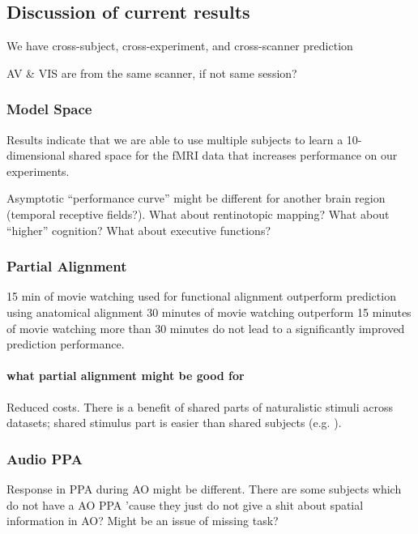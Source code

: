 \subsection{Discussion of current results}


We have cross-subject, cross-experiment, and cross-scanner prediction


AV \& VIS are from the same scanner, if not same session?

\subsubsection{Model Space}
%
Results indicate that we are able to use multiple subjects to learn a
10-dimensional shared space for the fMRI data that increases performance on our
experiments.

%
Asymptotic ``performance curve'' might be different for another brain region
(temporal receptive fields?).
%
What about rentinotopic mapping?
%
What about ``higher'' cognition?
%
What about executive functions?


\subsubsection{Partial Alignment}
%
15 min of movie watching used for functional alignment outperform prediction
using anatomical alignment
%
30 minutes of movie watching outperform 15 minutes of movie watching
%
more than 30 minutes do not lead to a significantly improved prediction
performance.


\paragraph{what partial alignment might be good for}
%
Reduced costs.
%
There is a benefit of shared parts of naturalistic stimuli across datasets;
shared stimulus part is easier than shared subjects (e.g.
\citep{zhang2018transfer}).


\subsubsection{Audio PPA}

%
Response in PPA during AO might be different.
%
There are some subjects which do not have a AO PPA 'cause they just do not give
a shit about spatial information in AO? Might be an issue of missing task?


